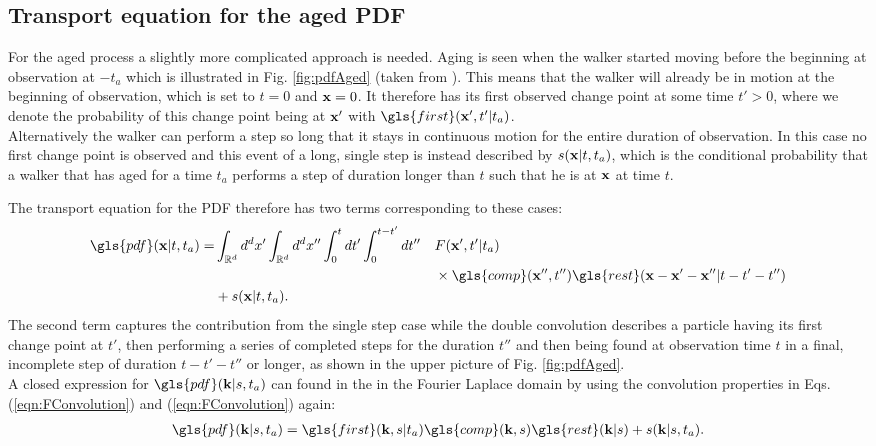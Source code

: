 \subsection{Transport equation for the aged PDF}

For the aged process a slightly more complicated approach is needed. Aging is seen when the walker started moving before the beginning at observation at $-t_a$ which is illustrated in Fig. \ref{fig:pdfAged} (taken from \cite{bothe}). 
This means that the walker will already be in motion at the beginning of observation, which is set to $t=0$ and $\mathbf{ x }=0$. It therefore has its first observed change point at some time $t'>0$, where we denote the probability of this change point being at $\mathbf{ x' }$ with $\gls{first}(\ve{x}',t'|t_a)$. \\
Alternatively the walker can perform a step so long that it stays in continuous motion for the entire duration of observation. In this case  no first change point is observed and this event of a long, single step is instead described by $s(\mathbf{ x }|t,t_a)$, which is the conditional probability that a walker that has aged for a time $t_a$ performs a step of duration longer than $t$ such that he is at $\mathbf{ x }$ at time $t$. 

The transport equation for the \gls{PDF} therefore has two terms corresponding to these cases:
%
\begin{alignat}{2}
\gls{pdf}(\ve{x}|t,t_a) = & \int_{\mathbb{R}^d} d^{d}x' \int_{\mathbb{R}^d} d^{d}x'' \int_{0}^{t} dt' \int_{0}^{t-t'} d t'' &&  F(\ve{x}',t'|t_a)\nonumber \\
& && \times \gls{comp}(\ve{x}'',t'') \gls{rest}(\ve{x}-\ve{x}'-\ve{x}''| t-t'-t'')\nonumber \\
& + s(\ve{x}|t,t_a) . && 
\end{alignat}
%
The second term captures the contribution from the single step case while the double convolution describes a particle having its first change point at $t'$, then performing a series of completed steps for the duration $t''$ and then being found at observation time $t$ in a final, incomplete step of duration $t-t'-t''$ or longer, as shown in the upper picture of Fig. \ref{fig:pdfAged}.\\
A closed expression for $\gls{pdf}(\ve{k}|s,t_a)$ can found in the in the Fourier Laplace domain by using the convolution properties in Eqs.  (\ref{eqn:FConvolution}) and (\ref{eqn:FConvolution}) again:
%
\begin{align}
\gls{pdf}(\ve{k}|s,t_a) =  \gls{first}(\ve{k},s|t_a)  \gls{comp}(\ve{k},s) \gls{rest}(\ve{k}|s) + s(\ve{k}|s,t_a) \label{eqn:pdfAgedFourierLaplace}.
\end{align}


